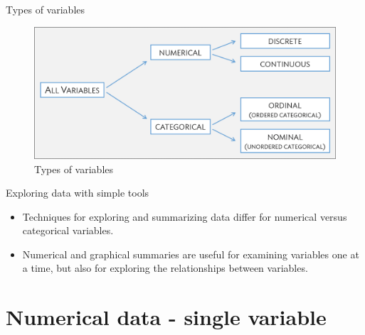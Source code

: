 \documentclass[10pt]{beamer}\usepackage[]{graphicx}\usepackage[]{color}
\begin{document}
\begin{frame}{Types of variables}
	\protect\hypertarget{types-of-variables-1}{}
	
	\begin{figure}
		\centering
		\includegraphics[scale=0.5]{figures/variableTypes.png}
		\caption{Types of variables}
	\end{figure}
	
\end{frame}



\begin{frame}{Exploring data with simple tools}
	\protect\hypertarget{exploring-data-with-simple-tools}{}
	
	\begin{itemize}
		\item Techniques for exploring and summarizing data differ for numerical
	versus categorical variables.
	
	\item Numerical and graphical summaries are useful for examining variables one
	at a time, but also for exploring the relationships between variables.
	\end{itemize}
	
\end{frame}


\section{Numerical data - single variable}\label{sec:numerical-data}
\end{document}
